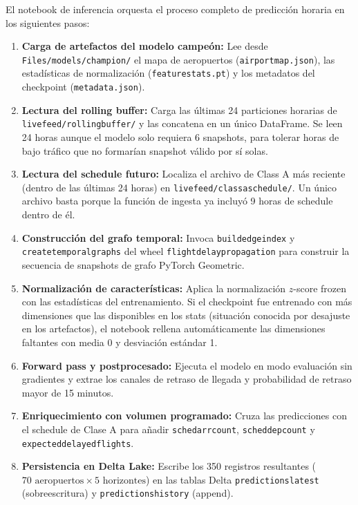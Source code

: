 \documentclass[12pt,oneside,a4paper]{report}
\renewcommand{\_}{\textunderscore\allowbreak}
\begin{document}
El notebook de inferencia orquesta el proceso completo de predicción horaria en los siguientes pasos:

\begin{enumerate}
    \item \textbf{Carga de artefactos del modelo campeón:} Lee desde \texttt{Files/models/champion/} el mapa de aeropuertos (\texttt{airport\_map.json}), las estadísticas de normalización (\texttt{feature\_stats.pt}) y los metadatos del checkpoint (\texttt{metadata.json}).
    \item \textbf{Lectura del rolling buffer:} Carga las últimas 24 particiones horarias de \texttt{live\_feed/rolling\_buffer/} y las concatena en un único DataFrame. Se leen 24 horas aunque el modelo solo requiera 6 snapshots, para tolerar horas de bajo tráfico que no formarían snapshot válido por sí solas.
    \item \textbf{Lectura del schedule futuro:} Localiza el archivo de Class A más reciente (dentro de las últimas 24 horas) en \texttt{live\_feed/class\_a\_schedule/}. Un único archivo basta porque la función de ingesta ya incluyó 9 horas de schedule dentro de él.
    \item \textbf{Construcción del grafo temporal:} Invoca \texttt{build\_edge\_index} y \texttt{create\_temporal\_graphs} del wheel \texttt{flight\_delay\_propagation} para construir la secuencia de snapshots de grafo PyTorch Geometric.
    \item \textbf{Normalización de características:} Aplica la normalización $z$-score frozen con las estadísticas del entrenamiento. Si el checkpoint fue entrenado con más dimensiones que las disponibles en los stats (situación conocida por desajuste en los artefactos), el notebook rellena automáticamente las dimensiones faltantes con media 0 y desviación estándar 1.
    \item \textbf{Forward pass y postprocesado:} Ejecuta el modelo en modo evaluación sin gradientes y extrae los canales de retraso de llegada y probabilidad de retraso mayor de 15 minutos.
    \item \textbf{Enriquecimiento con volumen programado:} Cruza las predicciones con el schedule de Clase A para añadir \texttt{sched\_arr\_count}, \texttt{sched\_dep\_count} y \texttt{expected\_delayed\_flights}.
    \item \textbf{Persistencia en Delta Lake:} Escribe los 350 registros resultantes ($70 \text{ aeropuertos} \times 5 \text{ horizontes}$) en las tablas Delta \texttt{predictions\_latest} (sobreescritura) y \texttt{predictions\_history} (append).
\end{enumerate}
\end{document}
